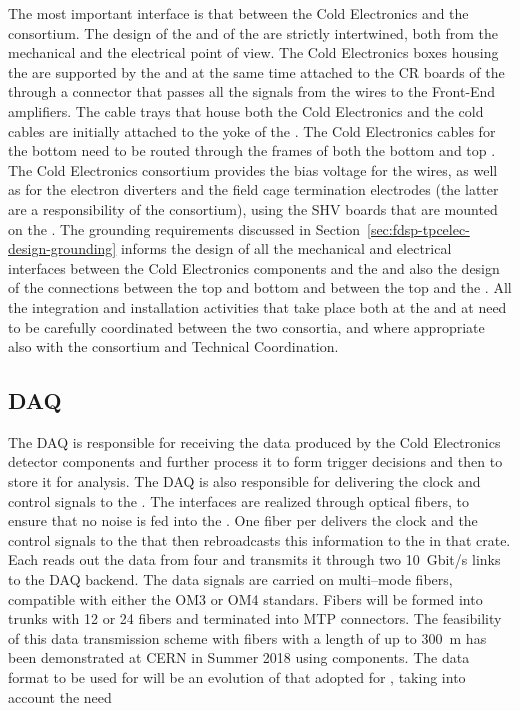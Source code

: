 The most important interface is that between the Cold Electronics
and the  consortium. The design of the 
and of the  are strictly intertwined, both from the
mechanical and the electrical point of view. The Cold Electronics
boxes housing the  are supported by the 
and at the same time attached to the CR boards of the 
through a connector that passes all the signals from the wires to
the Front-End amplifiers. The cable trays that house both the
Cold Electronics and the  cold cables are initially
attached to the yoke of the . The Cold Electronics
cables for the bottom  need to be routed through the 
frames of both the bottom and top . The Cold
Electronics consortium provides the bias voltage for the 
wires, as well as for the electron diverters and the field
cage termination electrodes (the latter are a responsibility of
the  consortium), using the SHV boards that are mounted
on the . The grounding requirements discussed in
Section~\ref{sec:fdsp-tpcelec-design-grounding} informs the
design of all the mechanical and electrical interfaces between
the Cold Electronics components and the  and also the
design of the connections between the top and bottom 
and between the top  and the . All the
integration and installation activities that take place both at
the  and at \surf need to be carefully coordinated between
the two consortia, and where appropriate also with the 
consortium and Technical Coordination.

\subsection{DAQ}
\label{sec:fdsp-tpcelec-interfaces-daq}

The DAQ is responsible for receiving the data produced by the
Cold Electronics detector components and further process it to
form trigger decisions and then to store it for analysis. The 
DAQ is also responsible for delivering the clock and control
signals to the . The interfaces are realized 
through optical fibers, to ensure that no noise is fed into
the . One fiber per  delivers the
clock and the control signals to the  that then
rebroadcasts this information to the  in that 
crate. Each  reads out the data from four 
and transmits it through two 10~Gbit/s links to the DAQ backend.
The data signals are carried on multi--mode fibers, compatible with 
either the OM3 or OM4 standars. Fibers will be formed into trunks with 
12 or 24 fibers and terminated into MTP connectors. The feasibility
of this data transmission scheme with fibers with a length of up
to 300~m has been demonstrated at CERN in Summer 2018 using 
 components. The data format to be used for 
 will be an evolution of that adopted for
, taking into account the need 

